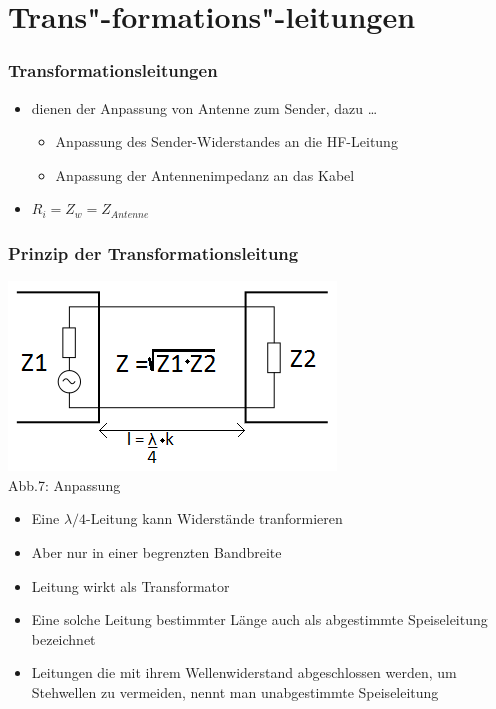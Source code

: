 \section*{Trans"-formations"-leitungen}
\begin{frame}
  \frametitle{Transformationsleitungen}
  \begin{itemize}
    \item dienen der Anpassung von Antenne zum Sender, dazu \dots
      \begin{itemize}
        \item Anpassung des Sender-Widerstandes an die HF-Leitung
        \item Anpassung der Antennenimpedanz an das Kabel
      \end{itemize}
    \item $R_i = Z_w = Z_{Antenne}$
  \end{itemize}
\end{frame}

\begin{frame}
  \frametitle{Prinzip der Transformationsleitung}
  \begin{center}
    \includegraphics[width=\textwidth,height=.35\textheight,keepaspectratio]{a10/Anpassung.png}\\
    {\tiny Abb.7: Anpassung \cite{wp}}
  \end{center}
  \begin{itemize}
    \item Eine $\lambda /4$-Leitung kann Widerstände tranformieren
    \item Aber nur in einer begrenzten Bandbreite
    \item Leitung wirkt als Transformator
    \item Eine solche Leitung bestimmter Länge auch als abgestimmte Speiseleitung bezeichnet
    \item Leitungen die mit ihrem Wellenwiderstand abgeschlossen werden, um Stehwellen zu vermeiden, nennt man unabgestimmte Speiseleitung
  \end{itemize}
\end{frame}

